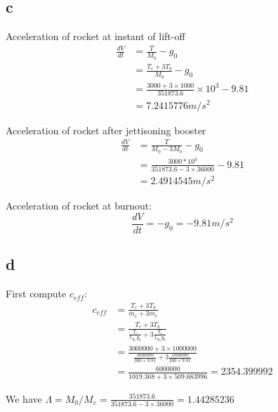 \subsection*{c}

Acceleration of rocket at instant of lift-off 
\begin{equation}
\begin{split}
    \frac{dV}{dt} &= \frac{T}{M_0} - g_0 \\
    &= \frac{T_c + 3T_b}{M_0} - g_0 \\
    &= \frac{3000+3\times 1000}{351873.6} \times 10^3 - 9.81 \\
    &= 7.2415776 m/s^2
\end{split}
\end{equation}

Acceleration of rocket after jettisoning booster
\begin{equation}
    \begin{split}
        \frac{dV}{dt} &= \frac{T}{M_0-3M_b} - g_0 \\
        &= \frac{3000*10^3}{351873.6-3\times 36000} - 9.81 \\
        &= 2.4914545 m/s^2
    \end{split}
\end{equation}

Acceleration of rocket at burnout:
\begin{equation}
    \frac{dV}{dt} =  - g_0 = -9.81 m/s^2
\end{equation}

\subsection*{d}
First compute $c_{eff}$:
\begin{equation}
\begin{split}
    c_{eff} &= \frac{T_c + 3T_b}{\dot{m}_c + 3 \dot{m}_c} \\
    &= \frac{T_c + 3T_b}{\frac{T_c}{I_{sp}_c g_0} + 3 \frac{T_c}{I_{sp}_b g_0}} \\
    &= \frac{3000000+3\times 1000000}{\frac{3000000}{300\times9.81} + 3 \frac{1000000}{200 \times 9.81}} \\ &=
    \frac{6000000}{1019.368+3\times509.683996} = 2354.399992
\end{split}
\end{equation}

We have $\Lambda = M_0/M_e = \frac{351873.6}{351873.6 - 3 \times 36000}=1.44285236$

